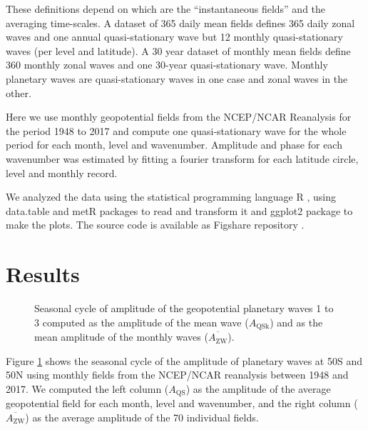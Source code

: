 \documentclass[draft,linenumbers]{agujournal2018}
\begin{document}
These definitions depend on which are the ``instantaneous fields'' and
the averaging time-scales. A dataset of 365 daily mean fields defines
365 daily zonal waves and one annual quasi-stationary wave but 12
monthly quasi-stationary waves (per level and latitude). A 30 year
dataset of monthly mean fields define 360 monthly zonal waves and one
30-year quasi-stationary wave. Monthly planetary waves are
quasi-stationary waves in one case and zonal waves in the other.

Here we use monthly geopotential fields from the NCEP/NCAR Reanalysis
\citep{Kalnay1996} for the period 1948 to 2017 and compute one
quasi-stationary wave for the whole period for each month, level and
wavenumber. Amplitude and phase for each wavenumber was estimated by
fitting a fourier transform for each latitude circle, level and monthly
record.

We analyzed the data using the statistical programming language R
\citep{R-base}, using data.table and metR packages
\citep{R-data.table, R-metR} to read and transform it and ggplot2
package \citep{R-ggplot2} to make the plots. The source code is
available as Figshare repository \citep{Campitelli2019-figshare}.

\section{Results}

\begin{figure}[h]

{\centering {}\newline{}

}

\caption{Seasonal cycle of amplitude of the geopotential planetary waves 1 to 3 computed as the amplitude of the mean wave ($A_\mathrm{QSk}$) and as the mean amplitude of the monthly waves ($\overline{A_\mathrm{ZW} }$).}\label{fig:rao}
\end{figure}

Figure \ref{fig:rao} shows the seasonal cycle of the amplitude of
planetary waves at 50\degree S and 50\degree N using monthly fields from
the NCEP/NCAR reanalysis \citep{Kalnay1996} between 1948 and 2017. We
computed the left column (\(A_\mathrm{QS}\)) as the amplitude of the
average geopotential field for each month, level and wavenumber, and the
right column (\(\overline{A_\mathrm{ZW}}\)) as the average amplitude of
the 70 individual fields.
\end{document}
